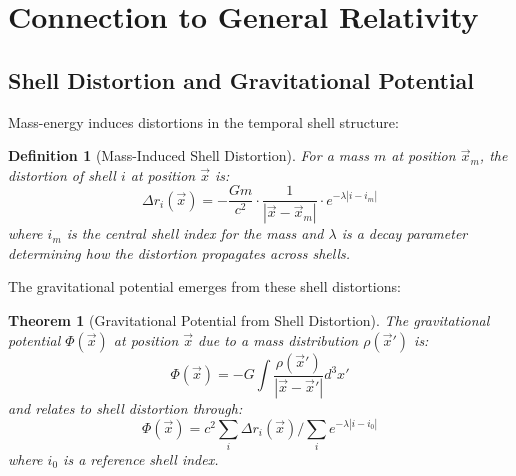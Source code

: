 \documentclass[12pt,a4paper]{article}
\newtheorem{theorem}{Theorem}[section]
\newtheorem{definition}{Definition}[section]
\begin{document}
\section{Connection to General Relativity}
\label{sec:connection-gr}

\subsection{Shell Distortion and Gravitational Potential}
\label{subsec:shell-distortion}

Mass-energy induces distortions in the temporal shell structure:

\begin{definition}[Mass-Induced Shell Distortion]
\label{def:mass-distortion}
For a mass $m$ at position $\vec{x}_m$, the distortion of shell $i$ at position $\vec{x}$ is:
\begin{equation}
\Delta r_i(\vec{x}) = -\frac{G m}{c^2} \cdot \frac{1}{|\vec{x} - \vec{x}_m|} \cdot e^{-\lambda |i - i_m|}
\end{equation}
where $i_m$ is the central shell index for the mass and $\lambda$ is a decay parameter determining how the distortion propagates across shells.
\end{definition}

The gravitational potential emerges from these shell distortions:

\begin{theorem}[Gravitational Potential from Shell Distortion]
\label{thm:gravitational-potential}
The gravitational potential $\Phi(\vec{x})$ at position $\vec{x}$ due to a mass distribution $\rho(\vec{x}')$ is:
\begin{equation}
\Phi(\vec{x}) = -G \int \frac{\rho(\vec{x}')}{|\vec{x} - \vec{x}'|} d^3x'
\end{equation}
and relates to shell distortion through:
\begin{equation}
\Phi(\vec{x}) = c^2 \sum_i \Delta r_i(\vec{x}) / \sum_i e^{-\lambda |i - i_0|}
\end{equation}
where $i_0$ is a reference shell index.
\end{theorem}
\end{document}
